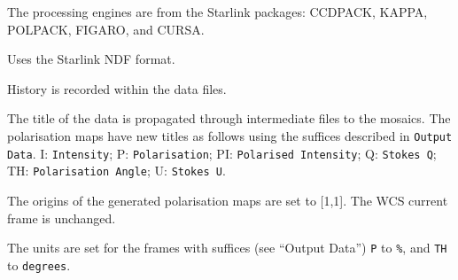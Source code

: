 \documentclass[twoside,11pt]{article}
\newcommand{\htmlref}[2]{#1}
\newcommand{\xref}[3]{#1}
\renewcommand{\_}{\texttt{\symbol{95}}}
\newcommand{\CCDPACK}{{\footnotesize CCDPACK}}
\newcommand{\CURSA}{{\footnotesize CURSA}}
\newcommand{\FIGARO}{\mbox{\footnotesize FIGARO}}
\newcommand{\KAPPA}{{\footnotesize KAPPA}}
\newcommand{\POLPACK}{{\footnotesize POLPACK}}
\newcommand{\sstitem}{\item}
\begin{document}
{{{         \sstitem
         The processing engines are from the Starlink packages: \xref{\CCDPACK}{sun139}{},
         \xref{\KAPPA}{sun95}{}, \xref{\POLPACK}{sun223}{},
         \xref{\FIGARO}{sun86}{}, and \xref{\CURSA}{sun190}{}.

         \sstitem
         Uses the Starlink NDF format.

         \sstitem
         History is recorded within the data files.

         \sstitem
         The title of the data is propagated through intermediate files
         to the mosaics.  The polarisation maps have new titles as follows
         using the suffices described in {\tt{Output Data}}.  I: {\tt{Intensity}};
         P: {\tt{Polarisation}}; PI: {\tt{Polarised Intensity}}; Q: {\tt{Stokes Q}};
         TH: {\tt{Polarisation Angle}}; U: {\tt{Stokes U}}.

         \sstitem
         The origins of the generated polarisation maps are set to [1,1].
         The WCS current frame is unchanged.

         \sstitem
         The units are set for the frames with suffices (see \htmlref{``Output Data''}{paj_data})
         {\tt{P}} to {\tt{\%}}, and {\tt{TH}} to {\tt{degrees}}.
      }
   }
}
\end{document}
